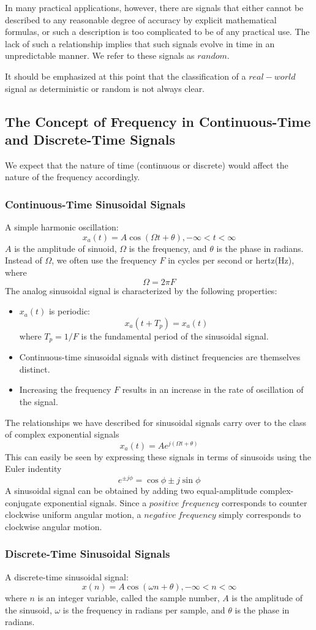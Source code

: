 \documentclass[10pt,a4paper,oneside]{article}
\begin{document}
In many practical applications, however, there are signals that either cannot be described to any reasonable degree of accuracy by explicit mathematical formulas, or such a description is too complicated to be of any practical use. The lack of such a relationship implies that such signals evolve in time in an unpredictable manner. We refer to these signals as $random$.

It should be emphasized at this point that the classification of a $real-world$ signal as deterministic or random is not always clear.
\subsection{The Concept of Frequency in Continuous-Time and Discrete-Time Signals}
We expect that the nature of time (continuous or discrete) would affect the nature of the frequency accordingly.
\subsubsection{Continuous-Time Sinusoidal Signals}
A simple harmonic oscillation:
\[
x_a(t) = A\cos(\Omega t+\theta), -\infty<t<\infty
\]
$A$ is the amplitude of sinuoid, $\Omega$ is the frequency, and $\theta$ is the phase in radians. Instead of $\Omega$, we often use the frequency $F$ in cycles per second or hertz(Hz), where
\[
\Omega = 2\pi F
\]
The analog sinusoidal signal is characterized by the following properties:
\begin{itemize}
\item  $x_a(t)$ is periodic:
\[
x_a(t+T_p)=x_a(t)
\]
where $T_p=1/F$ is the fundamental period of the sinusoidal signal.
\item Continuous-time sinusoidal signals with distinct frequencies are themselves distinct.
\item Increasing the frequency $F$ results in an increase in the rate of oscillation of the signal.
\end{itemize}
The relationships we have described for sinusoidal signals carry over to the class of complex exponential signals
\[
x_a(t) = Ae^{j(\Omega t+\theta)}
\]
This can easily be seen by expressing these signals in terms of sinusoids using the Euler indentity
\[
e^{\pm j\phi}=\cos \phi\pm j\sin \phi
\]
A sinusoidal signal can be obtained by adding two equal-amplitude complex-conjugate exponential signals. Since a $positive\ frequency$ corresponds to counter clockwise uniform angular motion, a $negative\ frequency$ simply corresponds to clockwise angular motion.
\subsubsection{Discrete-Time Sinusoidal Signals}
A discrete-time sinusoidal signal:
\[
x(n)=A\cos (\omega n+\theta), -\infty<n<\infty
\]
where $n$ is an integer variable, called the sample number, $A$ is the amplitude of the sinusoid, $\omega$ is the frequency in radians per sample, and $\theta$ is the phase in radians.
\end{document}
